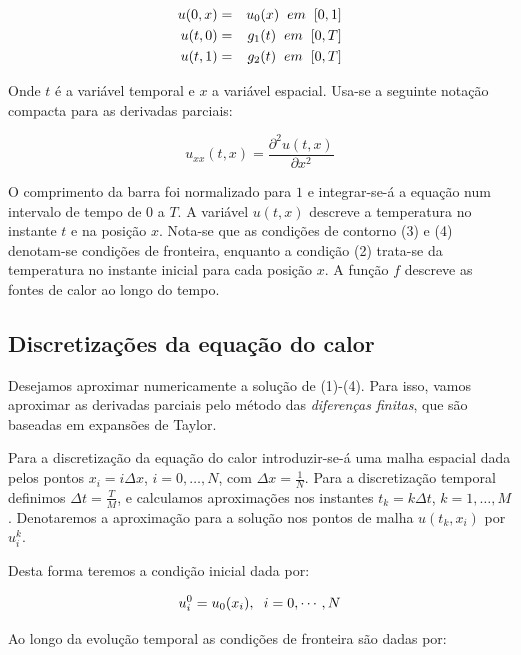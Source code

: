 \documentclass[a4paper, 12pt]{article}
\begin{document}
\begin{eqnarray}
u(0,x) & = & u_{0}(x) \hspace{0.2cm}em\hspace{0.2cm} [0,1]\\
u(t,0) & = & g_{1}(t) \hspace{0.2cm}em\hspace{0.2cm} [0,T]\\
u(t,1) & = & g_{2}(t) \hspace{0.2cm}em\hspace{0.2cm} [0,T]
\end{eqnarray}

Onde $t$ é a variável temporal e $x$ a variável espacial. Usa-se a seguinte notação compacta para as derivadas parciais:

$$u_{xx}(t,x)=\frac{\partial^{2}u(t,x)}{\partial x^2}$$

O comprimento da barra foi normalizado para $1$ e integrar-se-á a equação num intervalo de tempo de $0$ a $T$. A variável $u(t,x)$ descreve a temperatura no instante $t$ e na posição $x$. Nota-se que as condições de contorno (3) e (4) denotam-se condições de fronteira, enquanto a condição (2) trata-se da temperatura no instante inicial para cada posição $x$. A função $f$ descreve as fontes de calor ao longo do tempo.

\subsection{Discretizações da equação do calor}

Desejamos aproximar numericamente a solução de (1)-(4). Para isso, vamos aproximar as derivadas parciais pelo método das \textit{diferenças finitas}, que são baseadas em expansões de Taylor. 

Para a discretização da equação do calor introduzir-se-á uma malha espacial dada pelos pontos $x_{i} = i\Delta x$, $i=0, \dots ,N$, com $\Delta x=\frac{1}{N}$. Para a discretização temporal definimos $\Delta t =\frac{T}{M}$, e calculamos aproximações nos instantes $t_{k}=k\Delta t$, $k=1, \dots,M$. Denotaremos a aproximação para a solução nos pontos de malha $u(t_{k},x_{i})$ por $u_{i}^k$. 

Desta forma teremos a condição inicial dada por:

$$ u_{i}^0	= u_{0}(x_{i}), \hspace{0.2cm} i=0,\cdots,N	$$

Ao longo da evolução temporal as condições de fronteira são dadas por:
\end{document}
